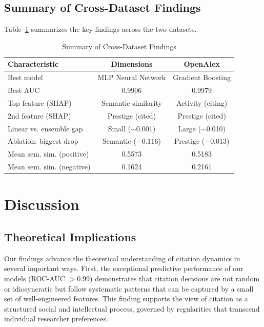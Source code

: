 \documentclass[12pt,a4paper]{article}
\begin{document}
\subsection{Summary of Cross-Dataset Findings}

Table~\ref{tab:crossdataset} summarizes the key findings across the two datasets.

\begin{table}[h!]
\centering
\caption{Summary of Cross-Dataset Findings}
\label{tab:crossdataset}
\begin{tabular}{lcc}
\toprule
\textbf{Characteristic} & \textbf{Dimensions} & \textbf{OpenAlex} \\
\midrule
Best model & MLP Neural Network & Gradient Boosting \\
Best AUC & 0.9906 & 0.9979 \\
Top feature (SHAP) & Semantic similarity & Activity (citing) \\
2nd feature (SHAP) & Prestige (cited) & Prestige (cited) \\
Linear vs. ensemble gap & Small ($\sim$0.001) & Large ($\sim$0.010) \\
Ablation: biggest drop & Semantic ($-0.116$) & Prestige ($-0.013$) \\
Mean sem. sim. (positive) & 0.5573 & 0.5183 \\
Mean sem. sim. (negative) & 0.1624 & 0.2161 \\
\bottomrule
\end{tabular}
\end{table}

\section{Discussion}
\label{sec:discussion}

\subsection{Theoretical Implications}

Our findings advance the theoretical understanding of citation dynamics in several important ways. First, the exceptional predictive performance of our models (ROC-AUC $> 0.99$) demonstrates that citation decisions are not random or idiosyncratic but follow systematic patterns that can be captured by a small set of well-engineered features. This finding supports the view of citation as a structured social and intellectual process, governed by regularities that transcend individual researcher preferences.
\end{document}
